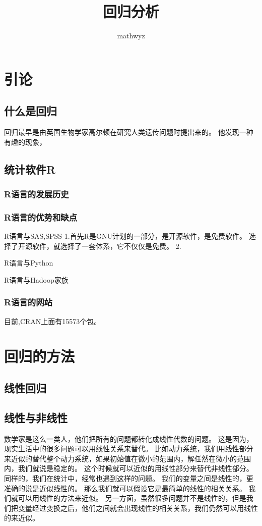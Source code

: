 \documentclass{amsart}
\title{回归分析}
\date{}
\author{mathwyz}
\begin{document}
\maketitle
\tableofcontents

\section{引论}

\subsection{什么是回归}
回归最早是由英国生物学家高尔顿在研究人类遗传问题时提出来的。
他发现一种有趣的现象，

\subsection{统计软件R}
\label{sec:02}

\subsubsection{R语言的发展历史}
\label{sec:0202}

\subsubsection{R语言的优势和缺点}
R语言与SAS,SPSS
1.首先R是GNU计划的一部分，是开源软件，是免费软件。
选择了开源软件，就选择了一套体系，它不仅仅是免费。
2.

R语言与Python

R语言与Hadoop家族
\subsubsection{R语言的网站}
\label{sec:0203}

目前,CRAN上面有15573个包。
\section{回归的方法}
\subsection{线性回归}
\subsection{线性与非线性}
数学家是这么一类人，他们把所有的问题都转化成线性代数的问题。
这是因为，现实生活中的很多问题可以用线性关系来替代。
比如动力系统，我们用线性部分来近似的替代整个动力系统，如果初始值在微小的范围内，解任然在微小的范围内，我们就说是稳定的。
这个时候就可以近似的用线性部分来替代非线性部分。
同样的，我们在统计中，经常也遇到这样的问题。
我们的变量之间是线性的，更准确的说是近似线性的。
那么我们就可以假设它是最简单的线性的相关关系。
我们就可以用线性的方法来近似。
另一方面，虽然很多问题并不是线性的，但是我们把变量经过变换之后，他们之间就会出现线性的相关关系，我们仍然可以用线性的来近似。
\end{document}
